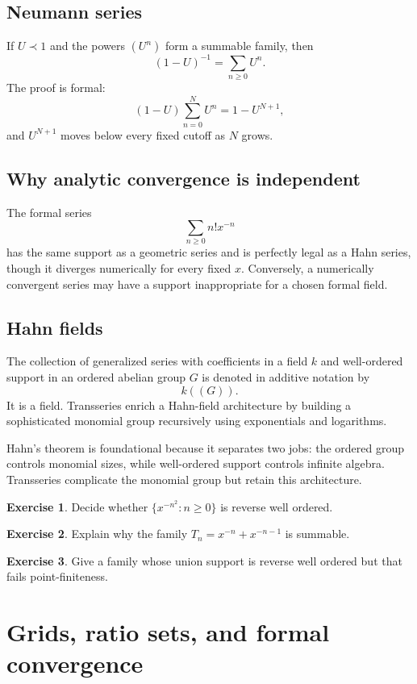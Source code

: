 \documentclass[11pt,oneside,openany]{book}
\theoremstyle{plain}
\theoremstyle{definition}
\newtheorem{exercise}{Exercise}[chapter]
\theoremstyle{remark}
\begin{document}
\section{Neumann series}
If $U\prec1$ and the powers $(U^n)$ form a summable family, then
\[
  (1-U)^{-1}=\sum_{n\ge0}U^n.
\]
The proof is formal:
\[
  (1-U)\sum_{n=0}^{N}U^n=1-U^{N+1},
\]
and $U^{N+1}$ moves below every fixed cutoff as $N$ grows.

\section{Why analytic convergence is independent}
The formal series
\[
  \sum_{n\ge0}n!x^{-n}
\]
has the same support as a geometric series and is perfectly legal as a Hahn series, though it diverges numerically for every fixed $x$. Conversely, a numerically convergent series may have a support inappropriate for a chosen formal field.

\section{Hahn fields}
The collection of generalized series with coefficients in a field $k$ and well-ordered support in an ordered abelian group $G$ is denoted in additive notation by
\[
  k((G)).
\]
It is a field. Transseries enrich a Hahn-field architecture by building a sophisticated monomial group recursively using exponentials and logarithms.

\begin{advancedbox}
Hahn's theorem is foundational because it separates two jobs: the ordered group controls monomial sizes, while well-ordered support controls infinite algebra. Transseries complicate the monomial group but retain this architecture.
\end{advancedbox}

\begin{exercise}
Decide whether $\{x^{-n^2}:n\ge0\}$ is reverse well ordered.
\end{exercise}

\begin{exercise}
Explain why the family $T_n=x^{-n}+x^{-n-1}$ is summable.
\end{exercise}

\begin{exercise}
Give a family whose union support is reverse well ordered but that fails point-finiteness.
\end{exercise}


\chapter{Grids, ratio sets, and formal convergence}
\label{ch:grids}
\end{document}
